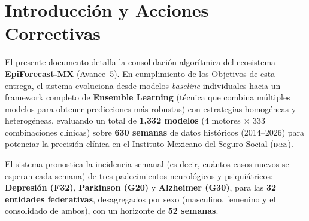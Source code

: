 \documentclass[12pt, letterpaper]{article}
\newcommand{\imss}{\textsc{imss}}
\begin{document}
\newpage


\section{Introducción y Acciones Correctivas}\label{sec:intro}

El presente documento detalla la consolidación algorítmica del ecosistema \textbf{EpiForecast-MX} (Avance~5). En cumplimiento de los Objetivos de esta entrega, el sistema evoluciona desde modelos \textit{baseline} individuales hacia un framework completo de \textbf{Ensemble Learning} (técnica que combina múltiples modelos para obtener predicciones más robustas) con estrategias homogéneas y heterogéneas, evaluando un total de \textbf{1,332 modelos} (4 motores $\times$ 333 combinaciones clínicas) sobre \textbf{630 semanas} de datos históricos (2014--2026) para potenciar la precisión clínica en el Instituto Mexicano del Seguro Social (\imss{}).

El sistema pronostica la incidencia semanal (es decir, cuántos casos nuevos se esperan cada semana) de tres padecimientos neurológicos y psiquiátricos: \textbf{Depresión (F32)}, \textbf{Parkinson (G20)} y \textbf{Alzheimer (G30)}, para las \textbf{32 entidades federativas}, desagregados por sexo (masculino, femenino y el consolidado de ambos), con un horizonte de \textbf{52 semanas}.
\end{document}

